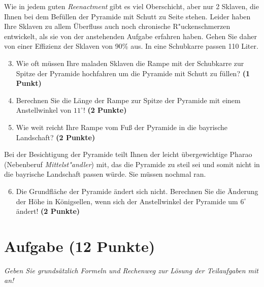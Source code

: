 \documentclass[a4paper, 10pt]{scrartcl}\usepackage[]{graphicx}\usepackage[]{xcolor}
\begin{document}
Wie in jedem guten \textit{Reenactment} gibt es viel Oberschicht, aber nur
2 Sklaven, die Ihnen bei dem Bef{\"u}llen der Pyramide mit Schutt
zu Seite stehen. Leider haben Ihre Sklaven zu allem {\"U}berfluss auch noch
chronische R{"u}ckenschmerzen entwickelt, als sie von der
anstehenden Aufgabe erfahren haben. Gehen Sie daher von einer Effizienz der
Sklaven von 90\% aus. In eine Schubkarre passen
110 Liter.

\begin{enumerate}
  \setcounter{enumi}{2}
\item Wie oft m{\"u}ssen Ihre maladen Sklaven die Rampe mit der Schubkarre
  zur Spitze der Pyramide hochfahren um die Pyramide mit Schutt zu f{\"u}llen? \textbf{(1 Punkt)}
\item Berechnen Sie die L{\"a}nge der Rampe zur Spitze der Pyramide mit einem
  Anstellwinkel von $11^\circ$! \textbf{(2 Punkte)}
\item Wie weit reicht Ihre Rampe vom Fu{\ss} der Pyramide in die bayrische
  Landschaft?  \textbf{(2 Punkte)}
\end{enumerate}

Bei der Besichtigung der Pyramide teilt Ihnen der leicht {\"u}bergewichtige
Pharao (Nebenberuf \textit{Mittelst{"a}ndler}) mit, das die Pyramide zu
steil sei und somit nicht in die bayrische Landschaft passen
w{\"u}rde. Sie m{\"u}ssen nochmal ran.

\begin{enumerate}
  \setcounter{enumi}{5}
\item Die Grundfl{\"a}che der Pyramide {\"a}ndert sich nicht. Berechnen Sie die
  {\"A}nderung der H{\"o}he in K{\"o}nigsellen, wenn sich der Anstellwinkel der
  Pyramide um $6^\circ$ {\"a}ndert!  \textbf{(2 Punkte)}
\end{enumerate}



\clearpage\null
\clearpage\null 
\clearpage

\section{Aufgabe \hfill (12 Punkte)}

\textit{Geben Sie grunds{\"a}tzlich Formeln und Rechenweg zur L{\"o}sung der
  Teilaufgaben mit an!} \\[1Ex]
\end{document}
